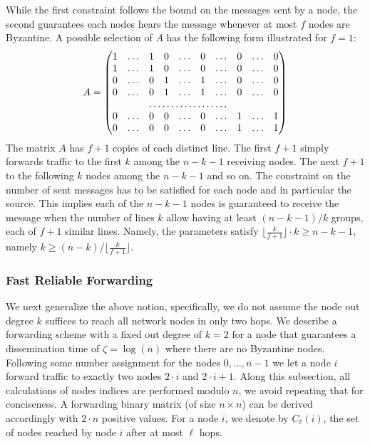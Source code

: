 While the first constraint follows the bound on the messages sent by a node, the second guarantees each nodes hears the message whenever at most $f$ nodes are Byzantine. A possible selection of $A$ has the following form illustrated for $f=1$:
\[
A = \begin{pmatrix}

1 & \dots & 1 & 0 & \dots & 0 & \dots & 0 & \dots & 0 \\
1 & \dots & 1 & 0 & \dots & 0 & \dots & 0 & \dots & 0 \\
0 & \dots & 0 & 1 & \dots & 1 &  \dots & 0 & \dots & 0 \\
0 & \dots & 0 & 1 & \dots & 1 &  \dots & 0 & \dots & 0 \\
    &  &  \hdotsfor{5} &  & \\
0 & \dots & 0  & 0 & \dots & 0 &  \dots & 1 & \dots & 1\\
0 & \dots & 0  & 0 & \dots & 0 &  \dots & 1 & \dots & 1\\
\end{pmatrix} 
\]
The matrix $A$ has $f+1$ copies of each distinct line. The first $f+1$ simply forwards traffic to the first $k$ among the $n-k-1$ receiving nodes.
The next $f+1$ to the following $k$ nodes among the $n-k-1$ and so on. 
The constraint on the number of sent messages has to be satisfied for each node and in particular the source. This implies each of the $n-k - 1$ nodes is guaranteed to receive the message when 
the number of lines $k$ allow having at least  $(n-k-1) / k$ groups, each of $f+1$ similar lines. 
Namely, the parameters satisfy $\lfloor \frac{k}{f+1} \rfloor \cdot k \ge n-k-1$, namely $k \ge (n-k) /  \lfloor \frac{k}{f+1}  \rfloor$. 


\subsubsection*{Fast Reliable Forwarding}
We next generalize the above notion, specifically, we do not assume the node out degree $k$ suffices to reach all network nodes in only two hops.
We describe a forwarding scheme with a fixed out degree of $k=2$ for a node that guarantees a dissemination time of $\zeta = \log(n)$ where there are no Byzantine nodes. 
Following some number assignment for the nodes $0, \ldots, n-1$ we let a node $i$ forward traffic to exactly two nodes $2 \cdot i$ and $2 \cdot i + 1$. Along this subsection, all calculations of nodes indices are performed modulo $n$, we avoid repeating that for conciseness.
A forwarding binary matrix  (of size $n \times n$) can be derived accordingly with $2 \cdot n$ positive values. For a node $i$, we denote by $C_{\ell}(i)$, the set of nodes reached by node $i$ after at most $\ell$ hops.

